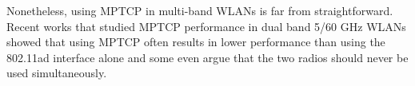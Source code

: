 
Nonetheless, using MPTCP in multi-band WLANs
is far from straightforward.
Recent works that studied MPTCP performance in dual band 5/60 GHz
WLANs
showed that using MPTCP often results in lower performance than using
the 802.11ad interface alone and 
some even argue that the two radios should never be used
simultaneously.

